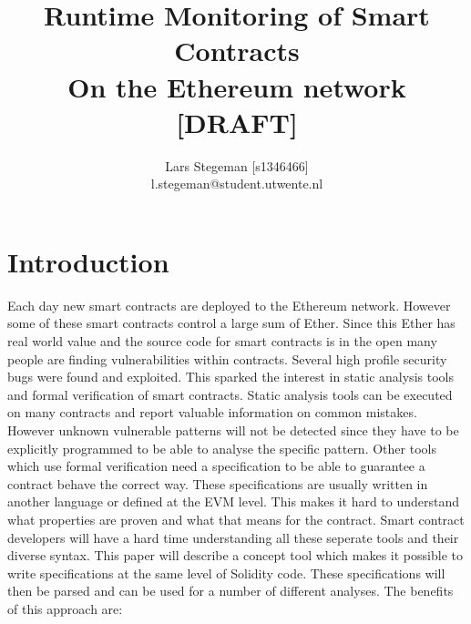 \documentclass[a4paper]{article}
\title{Runtime Monitoring of Smart Contracts \\
\large On the Ethereum network [DRAFT] \\}
\author{Lars Stegeman [s1346466]\\ l.stegeman@student.utwente.nl}
\begin{document}
\maketitle

\tableofcontents


\section{Introduction}
Each day new smart contracts are deployed to the Ethereum network. However some of these smart contracts control a large sum of Ether. Since this Ether has real world value and the source code for smart contracts is in the open many people are finding vulnerabilities within contracts. Several high profile security bugs were found and exploited. This sparked the interest in static analysis tools and formal verification of smart contracts. Static analysis tools can be executed on many contracts and report valuable information on common mistakes. However unknown vulnerable patterns will not be detected since they have to be explicitly programmed to be able to analyse the specific pattern. Other tools which use formal verification need a specification to be able to guarantee a contract behave the correct way. These specifications are usually written in another language or defined at the EVM level. This makes it hard to understand what properties are proven and what that means for the contract. Smart contract developers will have a hard time understanding all these seperate tools and their diverse syntax. This paper will describe a concept tool which makes it possible to write specifications at the same level of Solidity code. These specifications will then be parsed and can be used for a number of different analyses. The benefits of this approach are:
\end{document}
